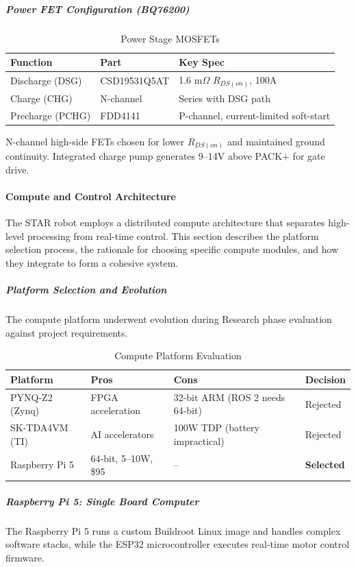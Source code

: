 \subparagraph{Power FET Configuration (BQ76200)}
\begin{table}[H]
\centering
\caption{Power Stage MOSFETs}
\begin{tabular}{@{}lll@{}}
\toprule
\textbf{Function} & \textbf{Part} & \textbf{Key Spec} \\
\midrule
Discharge (DSG) & CSD19531Q5AT & 1.6 m$\Omega$ $R_{DS(on)}$, 100A \\
Charge (CHG) & N-channel & Series with DSG path \\
Precharge (PCHG) & FDD4141 & P-channel, current-limited soft-start \\
\bottomrule
\end{tabular}
\end{table}

N-channel high-side FETs chosen for lower $R_{DS(on)}$ and maintained ground continuity. Integrated charge pump generates 9--14V above PACK+ for gate drive.


\paragraph{Compute and Control Architecture}
The STAR robot employs a distributed compute architecture that separates high-level processing from real-time control. This section describes the platform selection process, the rationale for choosing specific compute modules, and how they integrate to form a cohesive system.

\subparagraph{Platform Selection and Evolution}
The compute platform underwent evolution during Research phase evaluation against project requirements.

\begin{table}[H]
\centering
\caption{Compute Platform Evaluation}
\begin{tabular}{@{}llll@{}}
\toprule
\textbf{Platform} & \textbf{Pros} & \textbf{Cons} & \textbf{Decision} \\
\midrule
PYNQ-Z2 (Zynq) & FPGA acceleration & 32-bit ARM (ROS 2 needs 64-bit) & Rejected \\
SK-TDA4VM (TI) & AI accelerators & 100W TDP (battery impractical) & Rejected \\
Raspberry Pi 5 & 64-bit, 5--10W, \$95 & -- & \textbf{Selected} \\
\bottomrule
\end{tabular}
\end{table}

\subparagraph{Raspberry Pi 5: Single Board Computer}
The Raspberry Pi 5 runs a custom Buildroot Linux image and handles complex software stacks, while the ESP32 microcontroller executes real-time motor control firmware.

